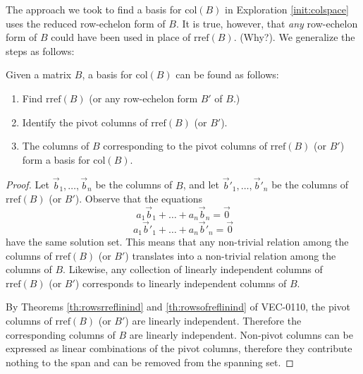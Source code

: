 \documentclass{ximera}
\begin{document}
The approach we took to find a basis for $\mbox{col}(B)$ in Exploration \ref{init:colspace} uses the reduced row-echelon form of $B$. It is true, however, that {\it any} row-echelon form of $B$ could have been used in place of $\mbox{rref}(B)$.  (Why?). We generalize the steps as follows:
\begin{procedure}\label{proc:colspace}
Given a matrix $B$, a basis for $\mbox{col}(B)$ can be found as follows:
\begin{enumerate}
\item Find $\mbox{rref}(B)$ (or any row-echelon form $B'$ of $B$.)
\item Identify the pivot columns of $\mbox{rref}(B)$ (or $B'$).
\item The columns of $B$ corresponding to the pivot columns of $\mbox{rref}(B)$ (or $B'$) form a basis for $\mbox{col}(B)$.
\end{enumerate}
\begin{proof}  Let $\vec{b}_1,\ldots ,\vec{b}_n$ be the columns of $B$, and let $\vec{b}'_1,\ldots ,\vec{b}'_n$ be the columns of $\mbox{rref}(B)$ (or $B'$).
Observe that the equations
\begin{equation}a_1\vec{b}_1+\ldots +a_n\vec{b}_n=\vec{0}\end{equation}
\begin{equation}a_1\vec{b}'_1+\ldots +a_n\vec{b}'_n=\vec{0}\end{equation}
have the same solution set.  This means that any non-trivial relation among the columns of $\mbox{rref}(B)$ (or $B'$) translates into a non-trivial relation among the columns of $B$.  Likewise, any collection of linearly independent columns of $\mbox{rref}(B)$ (or $B'$) corresponds to linearly independent columns of $B$.

By Theorems \ref{th:rowsrreflinind} and \ref{th:rowsofreflinind} of VEC-0110, the pivot columns of $\mbox{rref}(B)$ (or $B'$) are linearly independent.  Therefore the corresponding columns of $B$ are linearly independent.  Non-pivot columns can be expressed as linear combinations of the pivot columns, therefore they contribute nothing to the span and can be removed from the spanning set. 
\end{proof}
\end{procedure}
\end{document}
